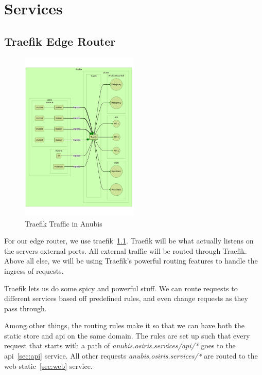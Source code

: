 \chapter{Services}\label{ch:services}


\section{Traefik Edge Router}\label{sec:traefik}

\begin{figure}[ht]
    \centering
    \includegraphics[width=0.5\textwidth]{figures/traefik.mmd}
    \caption{Traefik Traffic in Anubis\label{fig:traefik}}
\end{figure}

For our edge router, we use traefik~\ref{fig:traefik}.
Traefik will be what actually listens on the servers external ports.
All external traffic will be routed through Traefik.
Above all else, we will be using Traefik's powerful routing features to handle the ingress of requests.

Traefik lets us do some spicy and powerful stuff.
We can route requests to different services based off predefined rules,
and even change requests as they pass through.

Among other things, the routing rules make it so that we can have
both the static store and api on the same domain.
The rules are set up such that every request that
starts with a path of \textit{anubis.osiris.services/api/*} goes to the api~\ref{sec:api} service.
All other requests \textit{anubis.osiris.services/*} are routed to the web static~\ref{sec:web} service.

